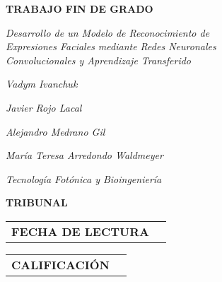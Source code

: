 \begin{titlepage}
\begin{large}
    \textbf{TRABAJO FIN DE GRADO}
        \signature{\break}{}
        \signature{Título}{\textit{Desarrollo de un Modelo de Reconocimiento de \\ Expresiones Faciales mediante Redes Neuronales \\ Convolucionales y Aprendizaje Transferido}}
        \signature{Autor}{\textit{Vadym Ivanchuk}}
        \signature{Tutor}{\textit{Javier Rojo Lacal}}
        \signature{Cotutor}{\textit{Alejandro Medrano Gil}}
        \signature{Ponente}{\textit{María Teresa Arredondo Waldmeyer}}
        \signature{Departamento}{\textit{Tecnología Fotónica y Bioingeniería}}
        \signature{\break}{}
    \textbf{TRIBUNAL}
        \signature{\break}{}
        \signature{Presidente}{\textit{}}
        \signature{Vocal}{\textit{}}
        \signature{Secretario}{\textit{}}
        \signature{Suplente}{\textit{}}
        \signature{\break}{}
    \hspace*{-1.5cm}\begin{tabular}{c | c}
        \textbf{FECHA DE LECTURA} & \\
    \end{tabular} 
    \newline \break
    \hspace*{-3.7cm}\begin{tabular}{c | c} 
        \textbf{CALIFICACIÓN} & \\
    \end{tabular}

\end{large}
\end{titlepage}


